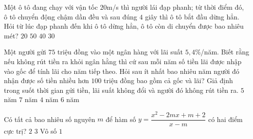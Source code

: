 \begin{ex}%
	Một ô tô đang chạy với vận tốc $20$m/s thì người lái đạp phanh; từ thời điểm đó, ô tô chuyển động chậm dần đều và sau đúng $4$ giây thì ô tô bắt đầu dừng hẳn. Hỏi từ lúc đạp phanh đến khi ô tô  dừng hẳn, ô tô còn di chuyển được bao nhiêu mét? 
	\choice
	{$20$}
	{$50$}
	{\True $40$}
	{$30$}
\end{ex}

\begin{ex}%
	Một người gửi $75$ triệu đồng vào một ngân hàng với lãi suất $5,4$\%/năm. Biết rằng nếu không rút tiền ra khỏi ngân hằng thì cứ sau mỗi năm số tiền lãi được nhập vào gốc để tính lãi cho năm tiếp theo. Hỏi sau ít nhất bao nhiêu năm người đó nhận được số tiền nhiều hơn $100$ triệu đồng bao gồm cả gốc và lãi? Giả định trong suốt thời gian gửi tiền, lãi suất không đổi và người đó không rút tiền ra.
	\choice
	{$5$ năm}
	{$7$ năm}
	{$4$ năm}
	{\True $6$ năm}
\end{ex}

\begin{ex}%
	Có tất cả bao nhiêu số nguyên $m$ để hàm số $y=\dfrac{x^2-2mx +m +2}{x-m}$ có hai điểm cực trị?
	\choice
	{\True $2$}
	{$3$}
	{Vô số}
	{$1$}
\end{ex}

